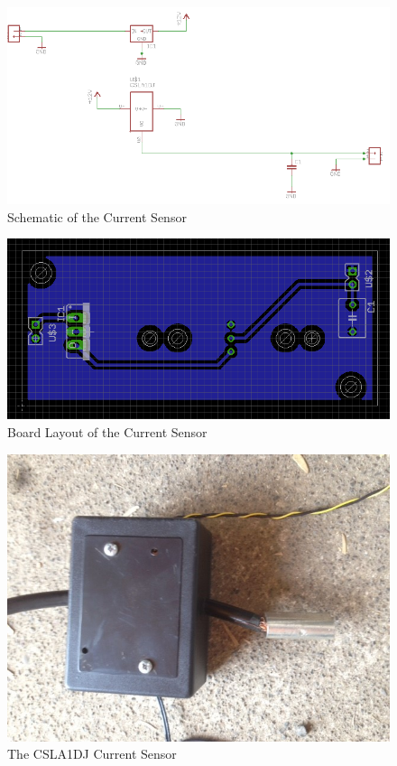 \documentclass[12pt]{article}
\begin{document}
\begin{figure}[!h]
\centering
\includegraphics[scale=0.6]{currentsensor}
\caption{Schematic of the Current Sensor}
\end{figure}

\begin{figure}[!h]
\centering
\includegraphics[scale=0.7]{currentboard}
\caption{Board Layout of the Current Sensor}
\end{figure}


\clearpage


\begin{figure}[!h]
\centering
\includegraphics[scale=0.55]{currentreal}
\caption{The CSLA1DJ Current Sensor}
\end{figure}
\end{document}
